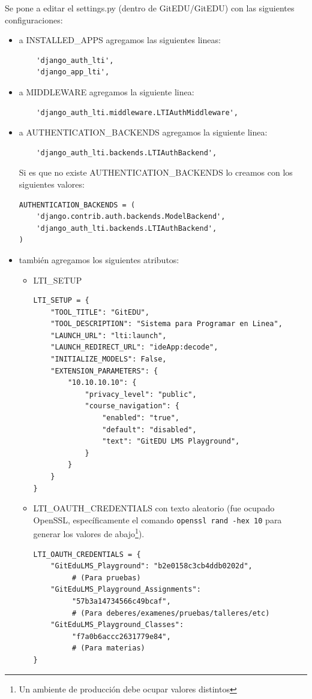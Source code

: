 Se pone a editar el settings.py (dentro de GitEDU/GitEDU) con las siguientes configuraciones:
\begin{itemize}
	\item a INSTALLED\_APPS agregamos las siguientes lineas:
   		\begin{lstlisting}
    'django_auth_lti',
    'django_app_lti',
    	\end{lstlisting}
    \item a MIDDLEWARE agregamos la siguiente linea:
   		\begin{lstlisting}
    'django_auth_lti.middleware.LTIAuthMiddleware',
    	\end{lstlisting}
    \item a AUTHENTICATION\_BACKENDS agregamos la siguiente linea:
   		\begin{lstlisting}
    'django_auth_lti.backends.LTIAuthBackend',
    	\end{lstlisting}
        Si es que no existe AUTHENTICATION\_BACKENDS lo creamos con los siguientes valores:
        \begin{lstlisting}
AUTHENTICATION_BACKENDS = (
    'django.contrib.auth.backends.ModelBackend',
    'django_auth_lti.backends.LTIAuthBackend',
)
        \end{lstlisting}
    \item también agregamos los siguientes atributos:
    	\begin{itemize}
    		\item LTI\_SETUP
            	\begin{lstlisting}
LTI_SETUP = {
    "TOOL_TITLE": "GitEDU",
    "TOOL_DESCRIPTION": "Sistema para Programar en Linea",
    "LAUNCH_URL": "lti:launch",
    "LAUNCH_REDIRECT_URL": "ideApp:decode",
    "INITIALIZE_MODELS": False,
    "EXTENSION_PARAMETERS": {
        "10.10.10.10": {
            "privacy_level": "public",
            "course_navigation": {
                "enabled": "true",
                "default": "disabled",
                "text": "GitEDU LMS Playground",
            }
        }
    }
}
            	\end{lstlisting}
            \item LTI\_OAUTH\_CREDENTIALS con texto aleatorio (fue ocupado OpenSSL, específicamente el comando \texttt{openssl rand -hex 10} para generar los valores de abajo\footnote{Un ambiente de producción debe ocupar valores distintos}).
            	\begin{lstlisting}
LTI_OAUTH_CREDENTIALS = {
    "GitEduLMS_Playground": "b2e0158c3cb4ddb0202d", 
         # (Para pruebas)
    "GitEduLMS_Playground_Assignments":
         "57b3a14734566c49bcaf",
         # (Para deberes/examenes/pruebas/talleres/etc)
    "GitEduLMS_Playground_Classes":
         "f7a0b6accc2631779e84",
         # (Para materias)
}
            	\end{lstlisting}
    	\end{itemize}
\end{itemize}

